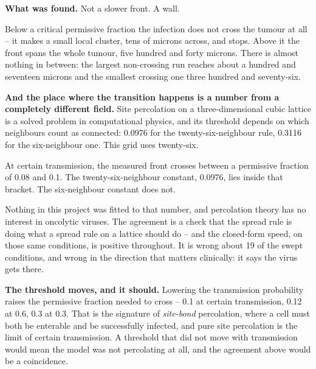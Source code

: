 \documentclass[11pt,twoside,openright]{report}
\begin{document}
\textbf{What was found.} Not a slower front. A wall.

\begin{finding}
Below a critical permissive fraction the infection does not cross the tumour at all -- it makes a small local cluster, tens of microns across, and stops. Above it the front spans the whole tumour, five hundred and forty microns. There is almost nothing in between: the largest non-crossing run reaches about a hundred and seventeen microns and the smallest crossing one three hundred and seventy-six.

\textbf{And the place where the transition happens is a number from a completely different field.} Site percolation on a three-dimensional cubic lattice is a solved problem in computational physics, and its threshold depends on which neighbours count as connected: 0.0976 for the twenty-six-neighbour rule, 0.3116 for the six-neighbour one. This grid uses twenty-six.

At certain transmission, the measured front crosses between a permissive fraction of 0.08 and 0.1. The twenty-six-neighbour constant, 0.0976, lies inside that bracket. The six-neighbour constant does not.
\end{finding}

Nothing in this project was fitted to that number, and percolation theory has no interest in oncolytic viruses. The agreement is a check that the spread rule is doing what a spread rule on a lattice should do -- and the closed-form speed, on those same conditions, is positive throughout. It is wrong about 19 of the swept conditions, and wrong in the direction that matters clinically: it says the virus gets there.

\textbf{The threshold moves, and it should.} Lowering the transmission probability raises the permissive fraction needed to cross -- 0.1 at certain transmission, 0.12 at 0.6, 0.3 at 0.3. That is the signature of \textit{site-bond} percolation, where a cell must both be enterable and be successfully infected, and pure site percolation is the limit of certain transmission. A threshold that did not move with transmission would mean the model was not percolating at all, and the agreement above would be a coincidence.
\end{document}

